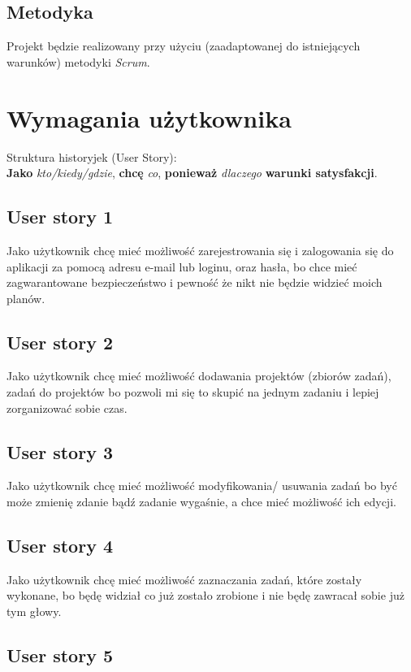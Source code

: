 \documentclass[a4paper]{article}
\begin{document}
\subsection{Metodyka}
\label{subsec:Metodyka}

Projekt będzie realizowany przy użyciu (zaadaptowanej do istniejących warunków) metodyki {\em Scrum}. 

\section{Wymagania użytkownika}
\label{sec:WymaganiaUzytkownika}
Struktura historyjek (User Story):\\
\textbf{Jako} \textit{kto/kiedy/gdzie}, \textbf{chcę} \textit{co}, \textbf{ponieważ}  \textit{dlaczego} \textbf{warunki satysfakcji}.

\subsection{User story 1}
\label{subsec:UserStory1}
Jako użytkownik chcę mieć możliwość zarejestrowania się i zalogowania się do aplikacji za pomocą adresu e-mail lub loginu, oraz hasła, bo chce mieć zagwarantowane bezpieczeństwo i pewność że nikt nie będzie widzieć moich planów.

\subsection{User story 2}
\label{subsec:UserStory2}
Jako użytkownik chcę mieć możliwość dodawania projektów (zbiorów zadań), zadań do projektów bo pozwoli mi się to skupić na jednym zadaniu i lepiej zorganizować sobie czas.

\subsection{User story 3}
\label{subsec:UserStory3}
Jako użytkownik chcę mieć możliwość modyfikowania/ usuwania zadań bo być może zmienię zdanie bądź zadanie wygaśnie, a chce mieć możliwość ich edycji.

\subsection{User story 4}
\label{subsec:UserStory4}
Jako użytkownik chcę mieć możliwość zaznaczania zadań, które zostały wykonane, bo będę widział co już zostało zrobione i nie będę zawracał sobie już tym głowy.

\subsection{User story 5}
\label{subsec:UserStory5}
\end{document}
